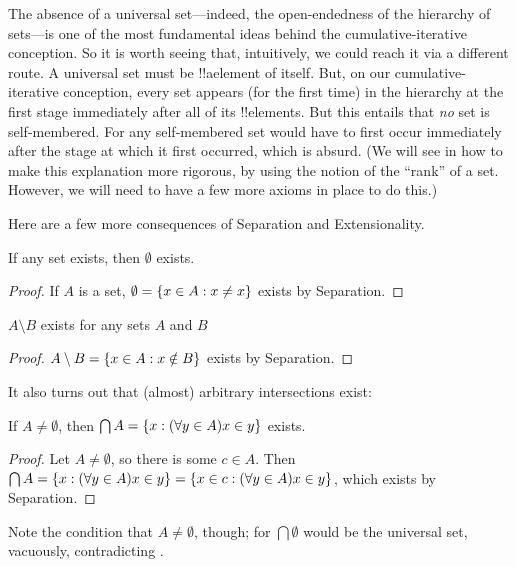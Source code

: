 \documentclass[../../../include/open-logic-section]{subfiles}
\begin{document}
The absence of a universal set---indeed, the open-endedness of the
hierarchy of sets---is one of the most fundamental ideas behind the
cumulative-iterative conception. So it is worth seeing that,
intuitively, we could reach it via a different route. A universal set
must be !!a{element} of itself. But, on our cumulative-iterative
conception, every set appears (for the first time) in the hierarchy at
the first stage immediately after all of its !!{element}s. But this
entails that \emph{no} set is self-membered. For any self-membered set
would have to first occur immediately after the stage at which it
first occurred, which is absurd. (We will see in
 how to make this explanation
more rigorous, by using the notion of the ``rank'' of a set. However,
we will need to have a few more axioms in place to do this.)

Here are a few more consequences of Separation and Extensionality.

\begin{prop}
If any set exists, then $\emptyset$ exists.
\end{prop}

\begin{proof}
If $A$ is a set, $\emptyset = \{ x \in A : x \neq x \}$ exists by Separation.
\end{proof}

\begin{prop}
$A \setminus B$ exists for any sets $A$ and $B$
\end{prop}

\begin{proof}
$A \setminus B = \{ x \in A : x \notin B \}$ exists by Separation.
\end{proof}

It also turns out that (almost) arbitrary intersections exist:

\begin{prop}
If $A \neq \emptyset$, then $\bigcap A = \{ x : (\forall y \in A)x \in y \}$ exists.
\end{prop}

\begin{proof}
Let $A \neq \emptyset$, so there is some $c \in A$. Then $\bigcap A =
\{ x : (\forall y \in A)x \in y \} = \{ x \in c : (\forall y \in
A)x \in y \}$, which exists by Separation. 
\end{proof}

Note the condition that $A \neq \emptyset$, though; for $\bigcap
\emptyset$ would be the universal set, vacuously, contradicting
.
\end{document}
